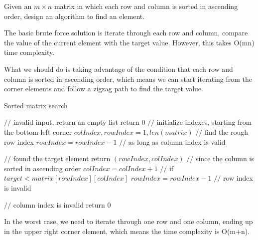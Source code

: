 \newpage
{} %

\problemdes

Given an $m \times n$ matrix in which each row and column is sorted in ascending order, design an algorithm to find an element.

\solution


The basic brute force solution is iterate through each row and column, compare the value of the current element with the target value. However, this takes O(mn) time complexity. 

What we should do is taking advantage of the condition that each row and column is sorted in ascending order, which means we can start iterating from the corner elements and follow a zigzag path to find the target value. 


\begin{algorithm}
  \caption{Sorted matrix search}
  {
  	$//$ invalid input, return an empty list\;
  	return $0$\;
  }
  $//$ initialize indexes, starting from the bottom left corner\;
  $colIndex, rowIndex = 1, len(matrix)$\;
  $//$ find the rough row index\;
  {
  	$rowIndex = rowIndex-1$\;
  }
  $//$ as long as column index is valid\;
  {
    {
       $//$ found the target element\;
       return $(rowIndex, colIndex)$\;
     }
    {
    	$//$ since the column is sorted in ascending order\;
    	$colIndex = colIndex+1$\;
     }
     $//$ if $target < matrix[rowIndex][colIndex]$\;
     {
     	$rowIndex = rowIndex-1$\;
     }
     $//$ row index is invalid\;
     
     $//$ column index is invalid\;
     return $0$\;
}
\end{algorithm}





In the worst case, we need to iterate through one row and one column, ending up in the upper right corner element, which means the time complexity is O(m+n).

